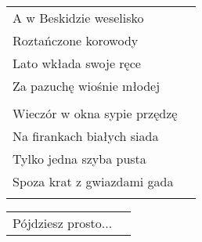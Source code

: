 \documentclass[a5paper]{article}
\begin{document}
\noindent
\begin{tabular}{@{}p{8.5cm}p{3cm}@{}}
A w Beskidzie weselisko \\
Roztańczone korowody \\
Lato wkłada swoje ręce \\
Za pazuchę wiośnie młodej \\ \\
 
Wieczór w okna sypie przędzę \\
Na firankach białych siada \\
Tylko jedna szyba pusta \\
Spoza krat z gwiazdami gada \\ \\
\end{tabular}

\noindent
\begin{tabular}{@{}p{8.5cm}p{3cm}@{}}
Pójdziesz prosto...
\end{tabular}
\end{document}
